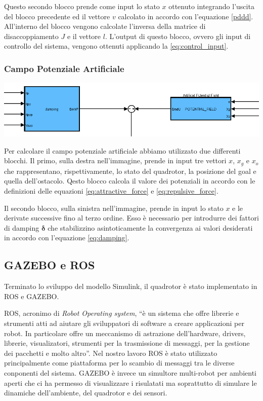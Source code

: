 \documentclass[a4paper,10pt]{article}
\begin{document}
Questo secondo blocco prende come input lo stato $x$ ottenuto integrando l'uscita del blocco precedente ed il vettore $v$ calcolato in accordo con l'equazione \ref{pddd}. All'interno del blocco vengono calcolate l'inversa della matrice di disaccoppiamento $J$ e il vettore $l$. L'output di questo blocco, ovvero gli input di controllo del sistema, vengono ottenuti applicando la \ref{eq:control_input}.

\subsubsection{Campo Potenziale Artificiale}

\begin{center}
\includegraphics[scale=0.4]{img/potential.png} 
\end{center}

Per calcolare il campo potenziale artificiale abbiamo utilizzato due differenti blocchi. Il primo, sulla destra nell'immagine, prende in input tre vettori $x$, $x_g$ e $x_o$ che rappresentano, rispettivamente, lo stato del quadrotor, la posizione del goal e quella dell'ostacolo. Qesto blocco calcola il valore dei potenziali in accordo con le definizioni delle equazioni \ref{eq:attractive_force} e \ref{eq:repulsive_force}.

Il secondo blocco, sulla sinistra nell'immagine, prende in input lo stato $x$ e le derivate successive fino al terzo ordine. Esso è necessario per introdurre dei fattori di damping $\mathbf{\delta}$ che stabilizzino asintoticamente la convergenza ai valori desiderati in accordo con l'equazione \ref{eq:damping}.

\subsection{GAZEBO e ROS}

Terminato lo sviluppo del modello Simulink, il quadrotor è stato implementato in ROS e GAZEBO.

ROS, acronimo di \emph{Robot Operating system}, ``è un sistema che offre librerie e strumenti atti ad aiutare gli sviluppatori di software a creare applicazioni per robot. In particolare offre un meccanismo di astrazione dell'hardware, drivers, librerie, visualizatori, strumenti per la trasmissione di messaggi, per la gestione dei pacchetti e molto altro''. Nel nostro lavoro ROS è stato utilizzato principalmente come piattaforma per lo scambio di messaggi tra le diverse conponenti del sistema. GAZEBO è invece un simultore multi-robot per ambienti aperti che ci ha permesso di visualizzare i risulatati ma soprattutto di simulare le dinamiche dell'ambiente, del quadrotor e dei sensori.
\end{document}
